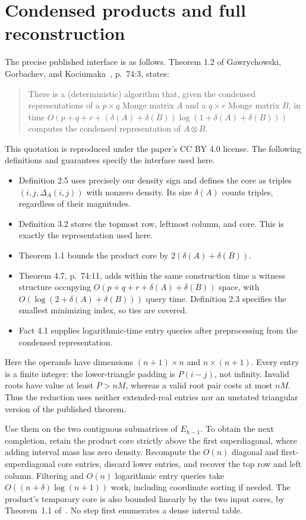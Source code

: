 \documentclass[11pt]{article}
\begin{document}
\section{Condensed products and full reconstruction}\label{sec:products}
The precise published interface is as follows. Theorem 1.2 of
Gawrychowski, Gorbachev, and Kociumaka~\cite{coremonge}, p.~74:3, states:
\begin{quote}
There is a (deterministic) algorithm that, given the condensed
representations of a $p\times q$ Monge matrix $A$ and a $q\times r$
Monge matrix $B$, in time
$O(p+q+r+(\delta(A)+\delta(B))\log(1+\delta(A)+\delta(B)))$
computes the condensed representation of $A\otimes B$.
\end{quote}
This quotation is reproduced under the paper's CC BY 4.0 license.
The following definitions and guarantees specify the interface used here.
\begin{itemize}
\item Definition 2.5 uses precisely our density sign and defines the core
as triples $(i,j,\Delta_A(i,j))$ with nonzero density. Its size $\delta(A)$
counts triples, regardless of their magnitudes.
\item Definition 3.2 stores the topmost row, leftmost column, and core.
This is exactly the representation used here.
\item Theorem 1.1 bounds the product core by
$2(\delta(A)+\delta(B))$.
\item Theorem 4.7, p.~74:11, adds within the same construction time a
witness structure occupying $O(p+q+r+\delta(A)+\delta(B))$ space, with
$O(\log(2+\delta(A)+\delta(B)))$ query time. Definition 2.3 specifies
the smallest minimizing index, so ties are covered.
\item Fact 4.1 supplies logarithmic-time entry queries after preprocessing
from the condensed representation.
\end{itemize}
Here the operands have dimensions $(n+1)\times n$ and $n\times(n+1)$.
Every entry is a finite integer: the lower-triangle padding is $P(i-j)$,
not infinity. Invalid roots have value at least $P>nM$, whereas a valid
root pair costs at most $nM$. Thus the reduction uses neither extended-real
entries nor an unstated triangular version of the published theorem.

Use them on the two contiguous submatrices of $E_{h-1}$. To obtain the
next completion, retain the product core strictly above the first
superdiagonal, where adding interval mass has zero density. Recompute the
$O(n)$ diagonal and first-superdiagonal core entries, discard lower entries,
and recover the top row and left column. Filtering and $O(n)$ logarithmic
entry queries take $O((n+\delta)\log(n+1))$ work, including coordinate
sorting if needed. The product's temporary core is also bounded linearly
by the two input cores, by Theorem~1.1 of~\cite{coremonge}. No step
first enumerates a dense interval table.
\end{document}
